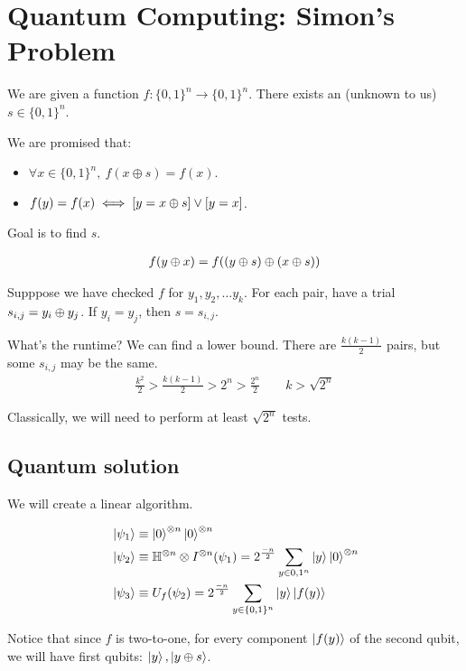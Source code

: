 \chapter{Quantum Computing: Simon's Problem}

We are given a function $f: \{0, 1\}^n \to \{0, 1\}^n$. There exists
an (unknown to us) $s \in \{0, 1\}^n$.


We are promised that:
\begin{itemize}
\item $\forall x \in \{0, 1\}^n,~ f(x \oplus s) = f(x)$.
\item $f(y) = f(x) \iff  [y = x \oplus s] \lor [y = x]$.
\end{itemize}
Goal is to find $s$.

\begin{align*}
f(y \oplus x) = f((y \oplus s) \oplus (x \oplus s))
\end{align*}


Supppose we have checked $f$ for $y_1, y_2, \dots y_k$.
For each pair, have a trial $s_{i, j} = y_i \oplus y_j$.  If $y_i = y_j$, then
$s = s_{i, j}$.

What's the runtime? We can find a lower bound. There are $\frac{k(k-1)}{2}$
pairs, but some $s_{i, j}$ may be the same. 
\begin{align*}
\frac{k^2}{2} > \frac{k(k-1)}{2} > 2^n > \frac{2^n}{2} \qquad k > \sqrt{2^n}
\end{align*}

Classically, we will need to perform at least $\sqrt{2^n}$ tests.

\section{Quantum solution} 
We will create a linear algorithm.

\begin{align*}
    &\ket{\psi_1} \equiv \ket0^{\otimes n} \ket0^{\otimes n} \\
    &\ket{\psi_2} \equiv \mathbb{H}^{\otimes n} \otimes I^{\otimes n} (\psi_1) = 
    2^{\frac{-n}{2}} \sum_{y \in {0, 1}^n} \ket y \ket 0^{\otimes n} \\
    &\ket{\psi_3} \equiv U_f(\psi_2) = 2^\frac{-n}{2} \sum_{y \in \{0, 1\}^n} \ket y \ket{f(y)} \\
\end{align*}

Notice that since $f$ is two-to-one, for every component $\ket{f(y)}$ of the second
qubit, we will have first qubits: $\ket{y}, \ket{y \oplus s}$.

